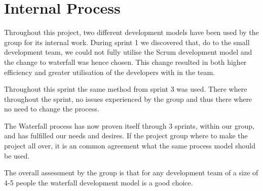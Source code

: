 \section{Internal Process}
Throughout this project, two different development models have been used by the group for its internal work.
During sprint 1 we discovered that, do to the small development team, we could not fully utilise the Scrum development model and the change to waterfall was hence chosen. 
This change resulted in both higher efficiency and greater utilisation of the developers with in the team.

Throughout this sprint the same method from sprint 3 was used.
There where throughout the sprint, no issues experienced by the group and thus there where no need to change the process. 

The Waterfall process has now proven itself through 3 sprints, within our group, and has fulfilled our needs and desires.
If the project group where to make the project all over, it is an common agreement what the same process model should be used. 

The overall assessment by the group is that for any development team of a size of 4-5 people the waterfall development model is a good choice. 

